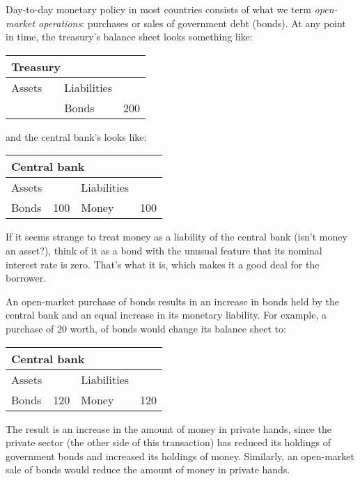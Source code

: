 Day-to-day monetary policy in most countries consists of what we term
{\it open-market operations\/}:  purchases or sales of
government debt (bonds).
At any point in time, the treasury's balance sheet looks
something like:
%
\begin{center}
\begin{tabular}{lr|lr}
\multicolumn{4}{l}{Treasury} \\
\hline
Assets\phantom{ities}  &\phantom{100}&  Liabilities \\
\hline
& & Bonds & 200
\end{tabular}
\end{center}
%
and the central bank's  looks like:
%
\begin{center}
\begin{tabular}{lr|lr}
\multicolumn{4}{l}{Central bank} \\
\hline
Assets\phantom{ities}  &&  Liabilities \\
\hline
Bonds &  100 & Money & 100
\end{tabular}
\end{center}
%
If it seems strange to treat money as a liability of the
central bank (isn't money an asset?),
think of it as a bond  with the unusual
feature that its nominal interest rate is zero.
That's what it is, which makes it a good deal for the borrower.

An open-market purchase of bonds  results in an increase
in bonds  held by the central bank and an equal increase in its
monetary liability.
For example, a purchase of 20 worth, of bonds  would change its
balance sheet to:
%
\begin{center}
\begin{tabular}{lr|lr}
\multicolumn{4}{l}{Central bank} \\
\hline
Assets\phantom{ities}  &&  Liabilities \\
\hline
Bonds &  120 & Money & 120
\end{tabular}
\end{center}
%
The result is an increase in the amount of money in private hands,
since the private sector (the other side of this transaction)
has reduced its holdings of government bonds 
and increased its holdings of money.
Similarly, an open-market sale of bonds  would reduce the amount of money in
private hands.

